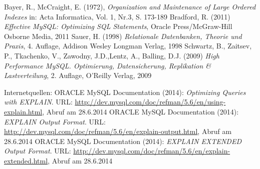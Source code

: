 \newpage
{}
  \begin{thebibliography}{}



	 Bayer, R., McCraight,  E. (1972), {\sl Organization and Maintenance of Large Ordered Indexes}
	     in: Acta Informatica, Vol. 1, Nr.3, S. 173-189
     Bradford, R. (2011) {\sl Effective MySQL: Optimizing SQL Statements}, Oracle Press/McGraw-Hill Osborne Media, 2011
     Sauer, H. (1998) {\sl Relationale Datenbanken, Theorie und Praxis}, 4. Auflage, Addison Wesley Longman Verlag, 1998
     Schwartz, B., Zaitsev, P., Tkachenko, V., Zawodny, J.D.,Lentz, A., Balling, D.J. (2009) 
        {\sl High Performance MySQL. Optimierung, Datensicherung, Replikation \& Lastverteilung}, 2. Auflage,  O'Reilly Verlag, 2009
	
	Internetquellen:
	ORACLE MySQL Documentation (2014): {\sl Optimizing Queries with EXPLAIN}. URL: 
	\url{http://dev.mysql.com/doc/refman/5.6/en/using-explain.html}, Abruf am 28.6.2014
    ORACLE MySQL Documentation (2014): {\sl EXPLAIN Output Format}. URL: \url{http://dev.mysql.com/doc/refman/5.6/en/explain-output.html}, Abruf am 28.6.2014
	ORACLE MySQL Documentation (2014): {\sl EXPLAIN EXTENDED Output Format}. URL:
	\url{http://dev.mysql.com/doc/refman/5.6/en/explain-extended.html}, Abruf am 28.6.2014

  \end{thebibliography}
